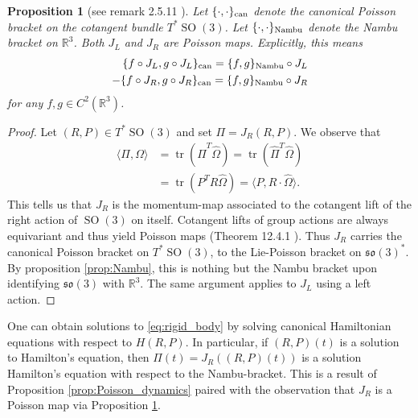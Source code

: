 \documentclass[12pt]{amsart}
\newcommand{\so}{\ensuremath{\mathfrak{so}}}
\newtheorem{prop}[thm]{Proposition}
\DeclareMathOperator{\SO}{SO}
\DeclareMathOperator{\tr}{tr}
\begin{document}
  \begin{prop}[see remark 2.5.11 \cite{HolmBook2}] \label{prop:SO3_to_Nambu}
    Let $\{ \cdot , \cdot \}_{\rm can}$ denote the canonical Poisson bracket
    on the cotangent bundle $T^{\ast}\SO(3)$.
    Let $\{ \cdot , \cdot \}_{\rm Nambu}$ denote the Nambu bracket on $\mathbb{R}^3$.
    Both $J_L$ and $J_R$ are Poisson maps.
    Explicitly, this means
    \begin{align*}
      \{ f \circ J_L , g \circ J_L \}_{\rm can} = \{ f , g \}_{\rm Nambu} \circ J_L \\
      - \{ f \circ J_R , g \circ J_R \}_{\rm can} = \{ f , g \}_{\rm Nambu} \circ J_R \\
    \end{align*}
    for any $f,g \in C^2( \mathbb{R}^3)$.
  \end{prop}
  \begin{proof}
    Let $(R,P) \in T^{\ast}\SO(3)$ and set $\Pi = J_R(R,P)$.
    We observe that
    \begin{align*}
      \langle \Pi , \Omega \rangle &= \tr( \hat{\Pi}^T \hat{\Omega} )
      = \tr( \hat{\Pi}^T \hat{\Omega} ) \\
      &= \tr( P^T R \hat{\Omega} ) 
      = \langle P , R \cdot \hat{\Omega} \rangle.
    \end{align*}
    This tells us that $J_R$ is the momentum-map associated
    to the cotangent lift of the right action of $\SO(3)$ on itself.
    Cotangent lifts of group actions are always equivariant
    and thus yield Poisson maps (Theorem 12.4.1 \cite{MandS}).
    Thus $J_R$ carries the canonical
    Poisson bracket on $T^{\ast}\SO(3)$, to the Lie-Poisson
    bracket on $\so(3)^*$.
    By proposition \ref{prop:Nambu}, this is nothing but the
    Nambu bracket upon identifying $\so(3)$ with $\mathbb{R}^3$.
    The same argument applies to $J_L$ using a left action.
  \end{proof}

  One can obtain solutions to \eqref{eq:rigid_body}
  by solving canonical Hamiltonian equations with respect to $H(R,P)$.
  In particular, if $(R,P)(t)$ is a solution to Hamilton's equation,
  then $\Pi(t) = J_R( (R,P)(t))$ is a solution Hamilton's equation
  with respect to the Nambu-bracket.
  This is a result of Proposition \ref{prop:Poisson_dynamics}
  paired with the observation that $J_R$ is a Poisson map via
  Proposition \ref{prop:SO3_to_Nambu}.
\end{document}
